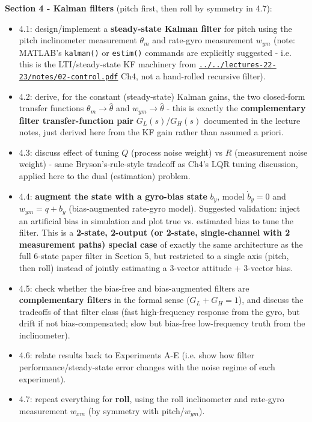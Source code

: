 \documentclass[11pt]{article}
\begin{document}
\textbf{Section 4 - Kalman filters} (pitch first, then roll by symmetry in 4.7):
\begin{itemize}
\item 4.1: design/implement a \textbf{steady-state Kalman filter} for pitch using the pitch inclinometer measurement $\theta_m$ and rate-gyro measurement $w_{ym}$ (note: MATLAB's \texttt{kalman()} or \texttt{estim()} commands are explicitly suggested - i.e. this is the LTI/steady-state KF machinery from \href{../../lectures-22-23/notes/02-control.pdf}{\texttt{../../lectures-22-23/notes/02-\allowbreak{}control.pdf}} Ch4, not a hand-rolled recursive filter).
\item 4.2: derive, for the constant (steady-state) Kalman gains, the two closed-form transfer functions $\theta_m \to \hat\theta$ and $w_{ym} \to \hat\theta$ - this is exactly the \textbf{complementary filter transfer-function pair} $G_L(s)$/$G_H(s)$ documented in the lecture notes, just derived here from the KF gain rather than assumed a priori.
\item 4.3: discuss effect of tuning $Q$ (process noise weight) vs $R$ (measurement noise weight) - same Bryson's-rule-style tradeoff as Ch4's LQR tuning discussion, applied here to the dual (estimation) problem.
\item 4.4: \textbf{augment the state with a gyro-bias state} $b_y$, model $\dot b_y = 0$ and $w_{ym} = q + b_y$ (bias-augmented rate-gyro model). Suggested validation: inject an artificial bias in simulation and plot true vs. estimated bias to tune the filter. This is a \textbf{2-state, 2-output (or 2-state, single-channel with 2 measurement paths) special case} of exactly the same architecture as the full 6-state paper filter in Section 5, but restricted to a single axis (pitch, then roll) instead of jointly estimating a 3-vector attitude + 3-vector bias.
\item 4.5: check whether the bias-free and bias-augmented filters are \textbf{complementary filters} in the formal sense ($G_L+G_H=1$), and discuss the tradeoffs of that filter class (fast high-frequency response from the gyro, but drift if not bias-compensated; slow but bias-free low-frequency truth from the inclinometer).
\item 4.6: relate results back to Experiments A-E (i.e. show how filter performance/steady-state error changes with the noise regime of each experiment).
\item 4.7: repeat everything for \textbf{roll}, using the roll inclinometer and rate-gyro measurement $w_{xm}$ (by symmetry with pitch/$w_{ym}$).
\end{itemize}
\end{document}
